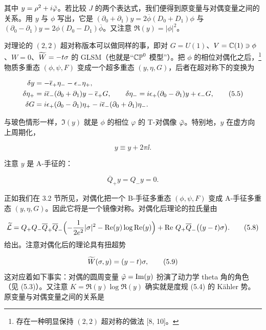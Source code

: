 
其中 $y=\rho^2+i\tilde\varphi$。若比较 $J$ 的两个表达式，我们便得到原变量与对偶变量之间的关系。用 $y$ 与 $\phi$ 写出，它是 $(\partial_0+\partial_1)y=2\overline{\phi}(D_0+D_1)\phi$ 与 $(\partial_0-\partial_1)y=2\phi(D_0-D_1)\overline{\phi}$。又注意 $\Re(y)=|\phi|^2$。

对理论的 $(2,2)$ 超对称版本可以做同样的事，即对 $G=U(1)$、$V=\mathbb{C}(1)\ni\phi$、$W=0$、$\widetilde{W}=-t\sigma$ 的 GLSM（也就是“$\mathbb{CP}^0$ 模型”）。把 $\phi$ 的相位对偶化之后，\footnote{存在一种明显保持 $(2,2)$ 超对称的做法 [8, 10]。}物质多重态 $(\phi,\psi,F)$ 变成一个超多重态 $(y,\eta,G)$，后者在超对称下的变换为

\begin{align}
    \delta y &= -\overline{\epsilon}_+\eta_- - \epsilon_-\eta_+, \notag\\
    \delta\eta_+ &= i\overline{\epsilon}_-(\partial_0+\partial_1)y-\overline{\epsilon}_+G,
        \qquad \delta\eta_- = i\epsilon_+(\partial_0-\partial_1)y+\epsilon_-G, \tag{5.5}\\
    \delta G &= i\epsilon_+(\partial_0-\partial_1)\eta_+ - i\overline{\epsilon}_-(\partial_0+\partial_1)\eta_-. \notag
\end{align}

与玻色情形一样，$\Im(y)$ 就是 $\phi$ 的相位 $\varphi$ 的 T-对偶像 $\tilde\varphi$。特别地，$y$ 在虚方向上周期化，

\begin{equation}
    y\equiv y+2\pi\ii.
    \tag{5.6}
\end{equation}

注意 $y$ 是 A-手征的：

\begin{equation}
    \overline{Q}_+y=Q_-y=0.
    \tag{5.7}
\end{equation}

正如我们在 3.2 节所见，对偶化把一个 B-手征多重态 $(\phi,\psi,F)$ 变成 A-手征多重态 $(y,\eta,G)$。因此它将是一个镜像对称。对偶化后理论的拉氏量由

\begin{equation}
    \widetilde{\mathcal{L}}=Q_+Q_-\overline{Q}_+\overline{Q}_-\Bigl(-\frac{1}{2e^2}|\sigma|^2-\operatorname{Re}(y)\log\operatorname{Re}(y)\Bigr)
        +\operatorname{Re}\,Q_+\overline{Q}_-\bigl((y-t)\sigma\bigr).
    \tag{5.8}
\end{equation}
给出。注意对偶化后的理论具有扭超势

\begin{equation}
    \widetilde{W}(\sigma,y)=(y-t)\sigma,
    \tag{5.9}
\end{equation}
这对应着如下事实：对偶的圆周变量 $\tilde\varphi=\operatorname{Im}(y)$ 扮演了动力学 theta 角的角色（见 (5.3)）。又注意 $K=\Re(y)\log\Re(y)$ 确实就是度规 (5.4) 的 Kähler 势。原变量与对偶变量之间的关系是

